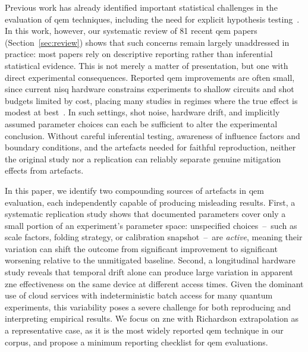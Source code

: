 \documentclass[10pt,conference]{IEEEtran}
\begin{document}
Previous work has already identified important statistical challenges in the evaluation of \gls{qem} techniques, including the need for explicit hypothesis testing~\cite{saki_hypothesis_2023}. In this work, however, our systematic review of 81 recent \gls{qem} papers (Section~\ref{sec:review}) shows that such concerns remain largely unaddressed in practice: most papers rely on descriptive reporting rather than inferential statistical evidence. This is not merely a matter of presentation, but one with direct experimental consequences. Reported \gls{qem} improvements are often small, since current \gls{nisq} hardware constrains experiments to shallow circuits and shot budgets limited by cost, placing many studies in regimes where the true effect is modest at best~\cite{russo_testing_2023,maupin_error_2024}. In such settings, shot noise, hardware drift, and implicitly assumed parameter choices can each be sufficient to alter the experimental conclusion. Without careful inferential testing, awareness of influence factors and boundary conditions, and the artefacts needed for faithful reproduction, neither the original study nor a replication can reliably separate genuine mitigation effects from artefacts.

In this paper, we identify two compounding sources of artefacts in \gls{qem} evaluation, each independently capable of producing misleading results. First, a systematic replication study shows that documented parameters cover only a small portion of an experiment's parameter space: unspecified choices~--~such as scale factors, folding strategy, or calibration snapshot~--~are \emph{active}, meaning their variation can shift the outcome from significant improvement to significant worsening relative to the unmitigated baseline. Second, a longitudinal hardware study reveals that temporal drift alone can produce large variation in apparent \gls{zne} effectiveness on the same device at different access times. Given the dominant use of cloud services with indeterministic batch access for many quantum experiments, this variability poses a severe challenge for both reproducing and interpreting empirical results. We focus on \gls{zne} with Richardson extrapolation as a representative case, as it is the most widely reported \gls{qem} technique in our corpus, and propose a minimum reporting checklist for \gls{qem} evaluations.
\end{document}
